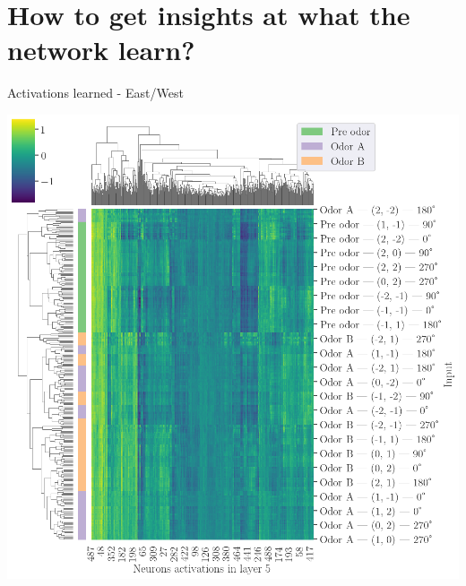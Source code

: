 \documentclass[bigger]{beamer}
\begin{document}
\section{How to get insights at what the network learn?}
\label{sec:orge184218}
\begin{frame}[label={sec:org0c72e93}]{Activations learned - East/West}
\begin{center}
\includegraphics[height=0.9\textheight]{img/activations-learned-EastWest.png}
\end{center}
\end{frame}
\end{document}
